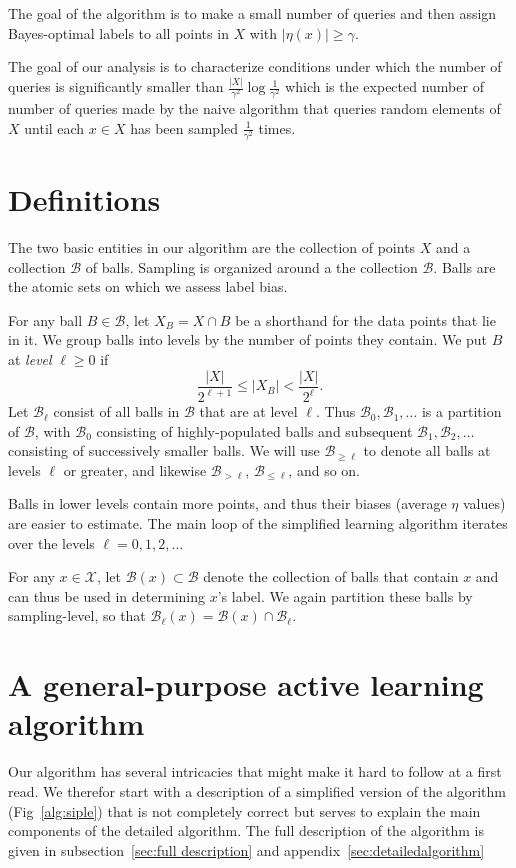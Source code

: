 \documentclass[twoside]{article}
\def\X{{\mathcal X}}
\def\B{{\mathcal B}}
\begin{document}
The goal of the algorithm is to make a small number of queries and then
assign Bayes-optimal labels to all points in $X$ with $|\eta(x)| \geq \gamma$.

The goal of our analysis is to characterize conditions under which the
number of queries is significantly smaller than
$\frac{|X|}{\gamma^2}\log \frac{1}{\gamma^2}$ which is the expected
  number of number of queries made by the naive algorithm that queries
  random elements of $X$ until each $x \in X$ has been sampled
  $\frac{1}{\gamma^2}$ times.

\section{Definitions}

The two basic entities in our algorithm are the collection of points
$X$ and a collection $\B$ of balls. Sampling is organized around a the
collection $\B$. Balls are the atomic sets on which we assess label
bias.

For any ball $B \in \B$, let $X_B = X \cap B$ be a shorthand for the
data points that lie in it.  We group balls into levels by the number
of points they contain. We put $B$ at {\it level} $\ell \geq 0$ if
\begin{equation}
\frac{|X|}{2^{\ell + 1}} \leq |X_B| < \frac{|X|}{2^\ell} .
\label{eq:sampling-level}
\end{equation}
Let $\B_\ell$ consist of all balls in $\B$ that are at level
$\ell$. Thus $\B_0, \B_1, \ldots$ is a partition of $\B$, with $\B_0$
consisting of highly-populated balls and subsequent
$\B_1, \B_2, \ldots$ consisting of successively smaller balls. We will
use $\B_{\geq \ell}$ to denote all balls at levels $\ell$ or greater,
and likewise $\B_{> \ell}$, $\B_{\leq \ell}$, and so on.

Balls in lower levels contain more points, and thus their biases
(average $\eta$ values) are easier to estimate. The main loop of the
simplified learning algorithm iterates over the levels $\ell=0,1,2,\ldots$

For any $x \in \X$, let $\B(x) \subset \B$ denote the collection of
balls that contain $x$ and can thus be used in determining $x$'s
label. We again partition these balls by sampling-level, so that
$\B_\ell(x) = \B(x) \cap \B_\ell$.

\section{A general-purpose active learning algorithm}
Our algorithm has several intricacies that might make it hard to
follow at a first read.  We therefor start with a description of a
simplified version of the algorithm (Fig~\ref{alg:siple}) that is not
completely correct but serves to explain the main components of the
detailed algorithm. The full description of the algorithm is given in
subsection~\ref{sec:full description} and appendix~\ref{sec:detailedalgorithm}
\end{document}
